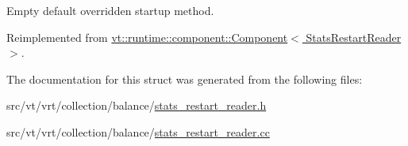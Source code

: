 Empty default overridden startup method. 



Reimplemented from \hyperlink{structvt_1_1runtime_1_1component_1_1_component_aad3974307ab3b2e1df389a91310f68c2}{vt\+::runtime\+::component\+::\+Component$<$ Stats\+Restart\+Reader $>$}.



The documentation for this struct was generated from the following files\+:\begin{DoxyCompactItemize}
\item 
src/vt/vrt/collection/balance/\hyperlink{stats__restart__reader_8h}{stats\+\_\+restart\+\_\+reader.\+h}\item 
src/vt/vrt/collection/balance/\hyperlink{stats__restart__reader_8cc}{stats\+\_\+restart\+\_\+reader.\+cc}\end{DoxyCompactItemize}
